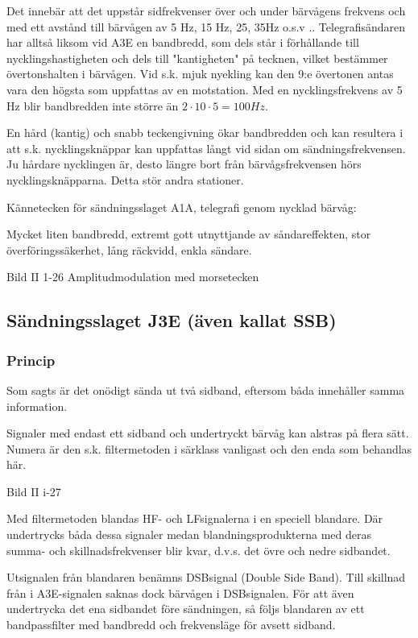 \documentclass[a4paper,twoside,twocolumn,openright]{book}
\begin{document}
Det innebär att det uppstår sidfrekvenser över och under bärvågens frekvens och med
ett avstånd till bärvågen av 5 Hz, 15 Hz, 25, 35Hz o.s.v .. Telegrafisändaren har alltså
liksom vid A3E en bandbredd, som dels står i förhållande till nycklingshastigheten och
dels till "kantigheten" på tecknen, vilket bestämmer övertonshalten i bärvågen. Vid s.k.
mjuk nyekling kan den 9:e övertonen antas vara den högsta som uppfattas av en motstation.
Med en nycklingsfrekvens av 5 Hz blir bandbredden inte större än
$2 \cdot 10 \cdot 5 = 100Hz$.

En hård (kantig) och snabb teckengivning ökar bandbredden och kan resultera i att s.k.
nycklingsknäppar kan uppfattas långt vid sidan om sändningsfrekvensen. Ju hårdare
nycklingen är, desto längre bort från bärvågsfrekvensen hörs nycklingsknäpparna. Detta
stör andra stationer.

Kännetecken för sändningsslaget A1A, telegrafi genom nycklad bärvåg:

Mycket liten bandbredd, extremt gott utnyttjande av såndareffekten, stor
överföringssäkerhet, lång räckvidd, enkla sändare.

Bild II 1-26 Amplitudmodulation med morsetecken

\subsection{Sändningsslaget J3E (även kallat SSB)}

\subsubsection{Princip}

Som sagts är det onödigt sända ut två sidband, eftersom båda innehåller samma information.

Signaler med endast ett sidband och undertryckt bärvåg kan alstras på flera sätt.
Numera är den s.k. filtermetoden i särklass vanligast och den enda som behandlas här.

Bild II i-27

Med filtermetoden blandas HF- och LFsignalerna i en speciell blandare. Där undertrycks
båda dessa signaler medan blandningsprodukterna med deras summa- och skillnadsfrekvenser
blir kvar, d.v.s. det övre och nedre sidbandet.

Utsignalen från blandaren benämns DSBsignal (Double Side Band). Till skillnad från
i A3E-signalen saknas dock bärvågen i DSBsignalen. För att även undertrycka det ena
sidbandet före sändningen, så följs blandaren av ett bandpassfilter med bandbredd
och frekvensläge för avsett sidband.
\end{document}

